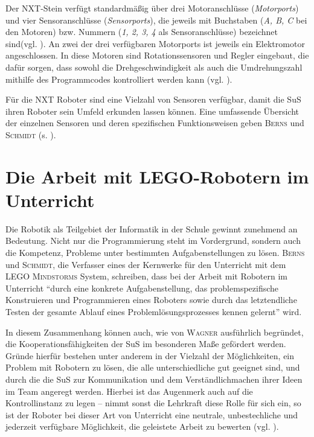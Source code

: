\documentclass[paper=a4, DIV=calc, BCOR=12mm, twoside=on, onecolumn=on, open = right, titlepage =on, parskip =half-, headsepline = on, footsepline = off, chapterprefix = off, appendixprefix = on, fontsize = 12pt, numbers = noenddot, abstract = on]{scrbook}
\begin{document}
Der NXT-Stein verfügt standardmäßig über drei Motoranschlüsse (\emph{Motorports}) und vier Sensoranschlüsse (\emph{Sensorports}), die jeweils mit Buchstaben (\emph{A, B, C} bei den Motoren) bzw. Nummern (\emph{1, 2, 3, 4} als Sensoranschlüsse) bezeichnet sind(vgl.  \cite[S.43]{berns:10}). An zwei der drei verfügbaren Motorports ist jeweils ein Elektromotor angeschlossen. In diese Motoren sind Rotationssensoren und Regler eingebaut, die dafür sorgen, dass sowohl die Drehgeschwindigkeit als auch die Umdrehungszahl mithilfe des Programmcodes kontrolliert werden kann (vgl. \cite[S.45--47]{berns:10}).

Für die NXT Roboter sind eine Vielzahl von Sensoren verfügbar, damit die SuS ihren Roboter sein Umfeld erkunden lassen können. Eine umfassende Übersicht der einzelnen Sensoren und deren spezifischen Funktionsweisen geben \textsc{Berns} und \textsc{Schmidt} (s. \cite[Kapitel 4.2]{berns:10}). 

\par \singlespacing
 \section{Die Arbeit mit LEGO-Robotern im Unterricht}
\onehalfspacing
Die Robotik als Teilgebiet der Informatik in der Schule gewinnt zunehmend an Bedeutung. Nicht nur die Programmierung steht im Vordergrund, sondern auch die Kompetenz, Probleme unter bestimmten Aufgabenstellungen zu lösen. \textsc{Berns} und \textsc{Schmidt}, die Verfasser eines der Kernwerke für den Unterricht mit dem \textsc{LEGO Mindstorms} System, schreiben, dass bei der Arbeit mit Robotern im Unterricht "`durch eine konkrete Aufgabenstellung, das problemspezifische Konstruieren und Programmieren eines Roboters sowie durch das letztendliche Testen der gesamte Ablauf eines Problemlösungsprozesses kennen gelernt"' \cite[S.2]{berns:10} wird.

In diesem Zusammenhang können auch, wie von \textsc{Wagner} ausführlich begründet, die Kooperationsfähigkeiten der SuS im besonderen Maße gefördert werden. Gründe hierfür bestehen unter anderem in der Vielzahl der Möglichkeiten, ein Problem mit Robotern zu lösen, die alle unterschiedliche gut geeignet sind, und durch die die SuS zur Kommunikation und dem Verständlichmachen ihrer Ideen im Team angeregt werden. Hierbei ist das Augenmerk auch auf die Kontrollinstanz zu legen -- nimmt sonst die Lehrkraft diese Rolle für sich ein, so ist der Roboter bei dieser Art von Unterricht eine neutrale, unbestechliche und jederzeit verfügbare Möglichkeit, die geleistete Arbeit zu bewerten (vgl. \cite[S.6f.]{wagner:05}).\\
\end{document}
